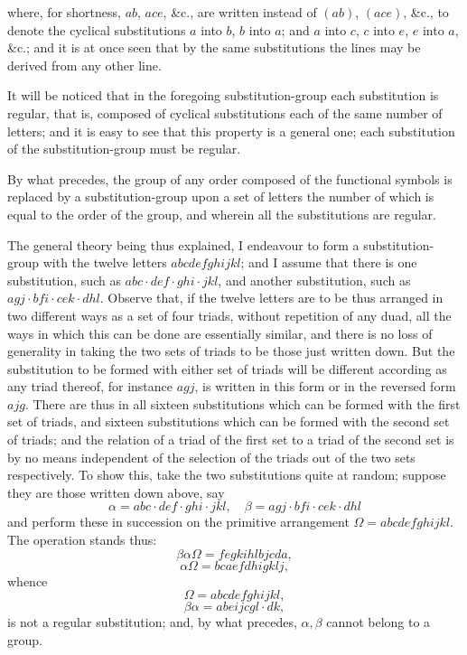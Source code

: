 \documentclass[11pt,a4paper]{article}
\begin{document}
\newpage


\noindent where, for shortness, $ab$, $ace$, \&c., are written instead of $(ab)$, $(ace)$, \&c., to denote the cyclical substitutions $a$ into $b$, $b$ into $a$; and $a$ into $c$, $c$ into $e$, $e$ into $a$, \&c.; and it is at once seen that by the same substitutions the lines may be derived from any other line.

\medskip

It will be noticed that in the foregoing substitution-group each substitution is regular, that is, composed of cyclical substitutions each of the same number of letters; and it is easy to see that this property is a general one; each substitution of the substitution-group must be regular.

\medskip

By what precedes, the group of any order composed of the functional symbols is replaced by a substitution-group upon a set of letters the number of which is equal to the order of the group, and wherein all the substitutions are regular.

\medskip

The general theory being thus explained, I endeavour to form a substitution-group with the twelve letters $abcdefghijkl$; and I assume that there is one substitution, such as $abc\cdot def\cdot ghi\cdot jkl$, and another substitution, such as $agj\cdot bfi\cdot cek\cdot dhl$. Observe that, if the twelve letters are to be thus arranged in two different ways as a set of four triads, without repetition of any duad, all the ways in which this can be done are essentially similar, and there is no loss of generality in taking the two sets of triads to be those just written down. But the substitution to be formed with either set of triads will be different according as any triad thereof, for instance $agj$, is written in this form or in the reversed form $ajg$. There are thus in all sixteen substitutions which can be formed with the first set of triads, and sixteen substitutions which can be formed with the second set of triads; and the relation of a triad of the first set to a triad of the second set is by no means independent of the selection of the triads out of the two sets respectively. To show this, take the two substitutions quite at random; suppose they are those written down above, say
\[
\alpha = abc\cdot def\cdot ghi\cdot jkl,\quad \beta = agj\cdot bfi\cdot cek\cdot dhl
\]
and perform these in succession on the primitive arrangement $\Omega = abcdefghijkl$. The operation stands thus:
\[
\beta\alpha\Omega = fegkihlbjcda,
\]
\[
\alpha\Omega = bcaefdhigklj,
\]
whence
\[
\Omega = abcdefghijkl,
\]
\[
\beta\alpha = abeijcgl\cdot dk,
\]
is not a regular substitution; and, by what precedes, $\alpha, \beta$ cannot belong to a group.
\end{document}
